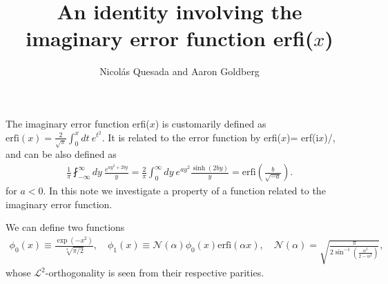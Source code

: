 \documentclass[11pt,letterpaper]{article}
\title{An identity involving the imaginary error function erfi($x$)}
\author{Nicol\'as Quesada and Aaron Goldberg}
\date{}
\newcommand{\eq}[1]{\begin{align}#1\end{align}}
\newcommand{\erfi}{\text{erfi}}
\newcommand{\iu}{\text{i}}
\begin{document}
\maketitle
The imaginary error function erfi($x$) is customarily defined as $\erfi(x) = \frac{2}{\sqrt{\pi}} \int_0^x dt \ e^{t^2}$.
It is related to the error function by erfi($x$)= erf($\iu x$)/\iu, and can be also defined as
\eq{
\frac{1}{\pi} \fint_{-\infty}^{\infty} dy\ \frac{e^{a y^2 +2 b y}}{ y} = \frac{2}{\pi}\int_0^\infty dy \ e^{a y^2}\frac{\sinh(2 b y)}{ y}=\erfi\left(\frac{b}{\sqrt{-a}}\right).
\label{eq:erfi-principal-integral}
}
for $a<0$. In this note we investigate a property of a function related to the imaginary error function.

We can define two functions
\eq{
  \phi_0(x)\equiv\frac{\exp\left(-x^2\right)}{\sqrt[4]{\pi/2}}, 
\quad   \phi_1(x)\equiv%
\mathcal{N}\left(\alpha\right)\phi_0\left(x\right)\erfi\left(\alpha x\right),
\quad	\mathcal{N}\left(\alpha\right)=\sqrt{\frac{\pi}{2\sin^{-1}\left(\frac{\alpha^2}{2-\alpha^2}\right)}},
}
whose $\mathcal{L}^2$-orthogonality is seen from their respective parities. 
\end{document}
